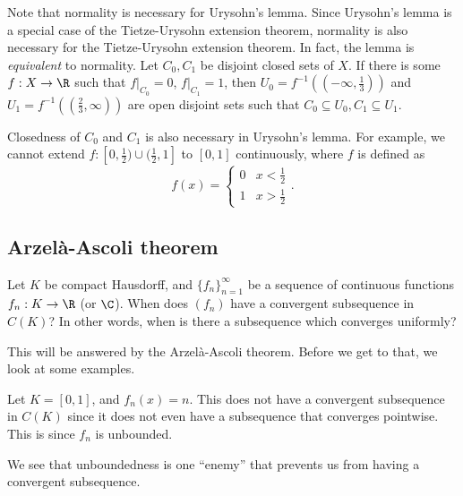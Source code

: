 \documentclass[a4paper]{article}
\begin{document}
Note that normality is necessary for Urysohn's lemma. Since Urysohn's lemma is a special case of the Tietze-Urysohn extension theorem, normality is also necessary for the Tietze-Urysohn extension theorem. In fact, the lemma is \emph{equivalent} to normality. Let $C_0, C_1$ be disjoint closed sets of $X$. If there is some $f: X \to \R$ such that $f|_{C_0} = 0$, $f|_{C_1} = 1$, then $U_0 = f^{-1}\left(\left(-\infty, \frac{1}{3}\right)\right)$ and $U_1 = f^{-1}\left(\left(\frac{2}{3}, \infty\right)\right)$ are open disjoint sets such that $C_0 \subseteq U_0, C_1 \subseteq U_1$.

Closedness of $C_0$ and $C_1$ is also necessary in Urysohn's lemma. For example, we cannot extend $f: [0, \frac{1}{2}) \cup (\frac{1}{2}, 1]$ to $[0, 1]$ continuously, where $f$ is defined as
\[
  f(x) =
  \begin{cases}
    0 & x < \frac{1}{2}\\
    1 & x > \frac{1}{2}
  \end{cases}.
\]
\subsection{Arzel\texorpdfstring{\`a}{a}-Ascoli theorem}
Let $K$ be compact Hausdorff, and $\{f_n\}_{n = 1}^\infty$ be a sequence of continuous functions $f_n: K \to \R$ (or $\C$). When does $(f_n)$ have a convergent subsequence in $C(K)$? In other words, when is there a subsequence which converges uniformly?

This will be answered by the Arzel\`a-Ascoli theorem. Before we get to that, we look at some examples.
\begin{eg}
  Let $K = [0, 1]$, and $f_n(x) = n$. This does not have a convergent subsequence in $C(K)$ since it does not even have a subsequence that converges pointwise. This is since $f_n$ is unbounded.
\end{eg}
We see that unboundedness is one ``enemy'' that prevents us from having a convergent subsequence.
\end{document}
